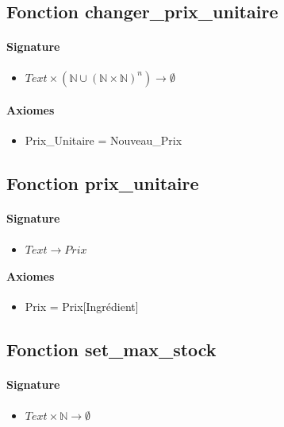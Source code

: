 \documentclass[]{article}
\begin{document}
\subsection*{Fonction changer\_prix\_unitaire}
\paragraph{Signature}
\begin{itemize}
\item
  $  Text \times (\mathbb{N} \cup (\mathbb{N} \times \mathbb{N})^{n}) \longrightarrow \emptyset $
\end{itemize}
\paragraph{Axiomes}
\begin{itemize}
\item
 Prix\_Unitaire = Nouveau\_Prix
\end{itemize}

\subsection*{Fonction prix\_unitaire}
\paragraph{Signature}
\begin{itemize}
\item
  $  Text \longrightarrow Prix $
\end{itemize}
\paragraph{Axiomes}
\begin{itemize}
\item
  Prix = Prix{[}Ingrédient{]}
\end{itemize}

\subsection*{Fonction set\_max\_stock}
\paragraph{Signature}
\begin{itemize}
\item
  $  Text \times \mathbb{N} \longrightarrow \emptyset $
\end{itemize}
\end{document}
